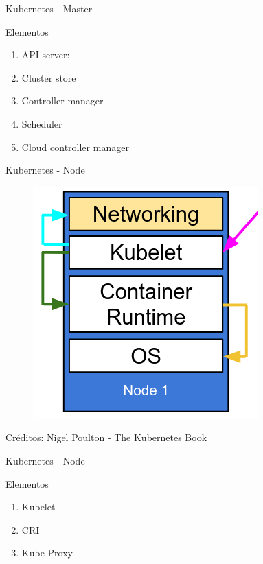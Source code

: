 \documentclass[aspectratio=169]{beamer}
\begin{document}
\begin{frame}{Kubernetes - Master}

    \begin{exampleblock}{Elementos}
        \begin{enumerate}
            \item API server:
            \item Cluster store
            \item Controller manager
            \item Scheduler
            \item Cloud controller manager
        \end{enumerate}
    \end{exampleblock}

\end{frame}

\begin{frame}{Kubernetes - Node}
    \begin{figure}
        \centering
        \includegraphics[width=0.3\linewidth]{Images/kuberarchnode.png}
    \end{figure}
Créditos: Nigel Poulton - The Kubernetes Book
\end{frame}



\begin{frame}{Kubernetes - Node}

    \begin{exampleblock}{Elementos}
        \begin{enumerate}
            \item Kubelet
            \item CRI
            \item Kube-Proxy
        \end{enumerate}
    \end{exampleblock}

\end{frame}
\end{document}
